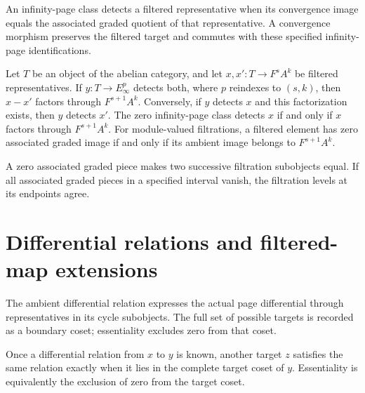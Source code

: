 \begin{definition}
\label{sem:SpectralSequence:detection}
An infinity-page class detects a filtered representative when its convergence image equals the associated graded quotient of that representative. A convergence morphism preserves the filtered target and commutes with these specified infinity-page identifications.

Let $T$ be an object of the abelian category, and let $x,x' : T\to F^sA^k$ be filtered representatives. If $y:T\to E_\infty^p$ detects both, where $p$ reindexes to $(s,k)$, then $x-x'$ factors through $F^{s+1}A^k$. Conversely, if $y$ detects $x$ and this factorization exists, then $y$ detects $x'$. The zero infinity-page class detects $x$ if and only if $x$ factors through $F^{s+1}A^k$. For module-valued filtrations, a filtered element has zero associated graded image if and only if its ambient image belongs to $F^{s+1}A^k$.

A zero associated graded piece makes two successive filtration subobjects equal. If all associated graded pieces in a specified interval vanish, the filtration levels at its endpoints agree.
\end{definition}


\section{Differential relations and filtered-map extensions}

\begin{definition}
\label{sem:SpectralSequence:ambient-differential}
The ambient differential relation expresses the actual page differential through representatives in its cycle subobjects. The full set of possible targets is recorded as a boundary coset; essentiality excludes zero from that coset.

Once a differential relation from $x$ to $y$ is known, another target $z$ satisfies the same relation exactly when it lies in the complete target coset of $y$. Essentiality is equivalently the exclusion of zero from the target coset.
\end{definition}


